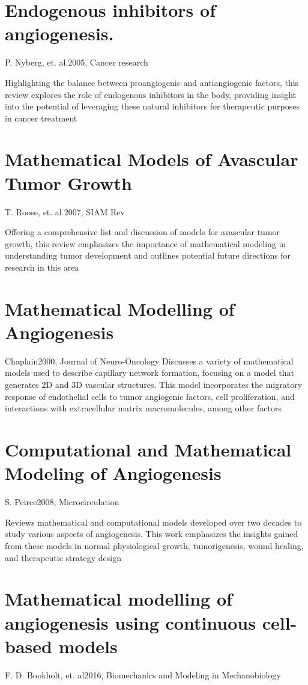 \section{Endogenous inhibitors of angiogenesis.}{P. Nyberg, et. al.}{2005, Cancer research}

Highlighting the balance between proangiogenic and antiangiogenic factors, this review explores the role of endogenous inhibitors in the body, providing insight into the potential of leveraging these natural inhibitors for therapeutic purposes in cancer treatment \cite{Nyberg2005}

\section{Mathematical Models of Avascular Tumor Growth}{T. Roose, et. al.}{2007, SIAM Rev}

Offering a comprehensive list and discussion of models for avascular tumor growth, this review emphasizes the importance of mathematical modeling in understanding tumor development and outlines potential future directions for research in this area \cite{Roose2007}

\section{Mathematical Modelling of Angiogenesis}{Chaplain}{2000, Journal of Neuro-Oncology}
Discusses a variety of mathematical models used to describe capillary network formation, focusing on a model that generates 2D and 3D vascular structures. This model incorporates the migratory response of endothelial cells to tumor angiogenic factors, cell proliferation, and interactions with extracellular matrix macromolecules, among other factors \cite{Chaplain2000}

\section{Computational and Mathematical Modeling of Angiogenesis}{S. Peirce}{2008, Microcirculation}

Reviews mathematical and computational models developed over two decades to study various aspects of angiogenesis. This work emphasizes the insights gained from these models in normal physiological growth, tumorigenesis, wound healing, and therapeutic strategy design \cite{Peirce2008}


\section{Mathematical modelling of angiogenesis using continuous cell-based models}{F. D. Bookholt, et. al}{2016, Biomechanics and Modeling in Mechanobiology}

